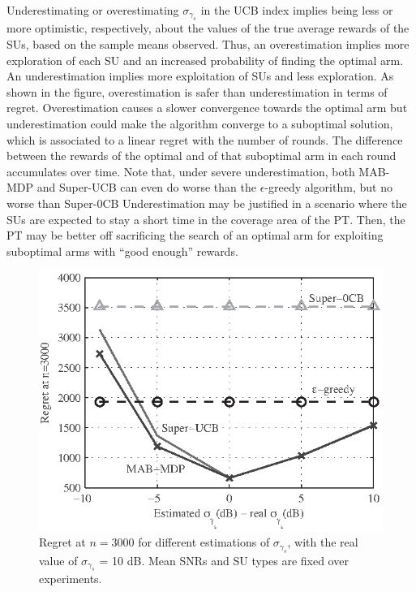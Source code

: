Underestimating or overestimating $\sigma_{\gamma_s}$ in the UCB index implies being less or more optimistic, respectively, about the values of the true average rewards of the SUs, based on the sample means observed. 
Thus, an overestimation implies more exploration of each SU and an increased probability of finding the optimal arm.
An underestimation implies more exploitation of SUs and less exploration. 
As shown in the figure, overestimation is safer than underestimation in terms of regret.
Overestimation causes a slower convergence towards the optimal arm but underestimation could make the algorithm converge to a suboptimal solution, which is associated to a linear regret with the number of rounds. The difference between the rewards of the optimal and of that suboptimal arm in each round accumulates over time.  
Note that, under severe underestimation, both MAB-MDP and Super-UCB can even do worse than the $\epsilon$-greedy algorithm, but no worse than Super-0CB
Underestimation may be justified in a scenario where the SUs are expected to stay a short time in the coverage area of the PT. 
Then, the PT may be better off sacrificing the search of an optimal arm for exploiting suboptimal arms with ``good enough'' rewards.


\begin{figure}[!t]
\centering
\includegraphics{unknownVar.eps}
\caption{Regret at $n = 3000$ for different estimations of $\sigma_{\gamma_s}$, with the real value of $\sigma_{\gamma_s}$ = 10 dB. Mean SNRs and SU types are fixed over experiments.}
\label{fig:unknownVar}
\end{figure}

